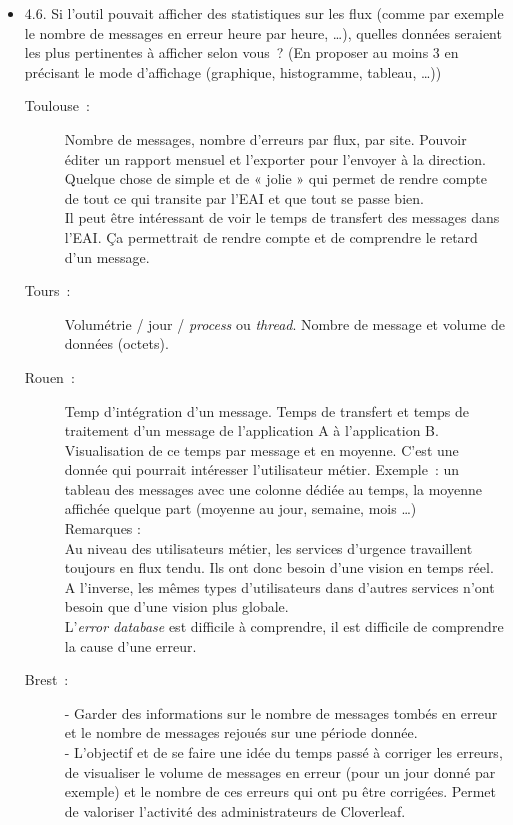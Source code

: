 \begin{itemize}
	  \item 4.6. Si l’outil pouvait afficher des statistiques sur les flux (comme
	  par exemple le nombre de messages en erreur heure par heure, …), quelles
	  données seraient les plus pertinentes à afficher selon vous~? (En proposer au
	  moins 3 en précisant le mode d’affichage (graphique, histogramme, tableau,
	  …))
	  \begin{description}
	  	\item[Toulouse~:] Nombre de messages, nombre d’erreurs par flux, par site.
	  	Pouvoir éditer un rapport mensuel et l’exporter pour l’envoyer à la
	  	direction. Quelque chose de simple et de « jolie » qui permet de rendre
	  	compte de tout ce qui transite par l’EAI et que tout se passe bien.\\
		Il peut être intéressant de voir le temps de transfert des messages dans l’EAI.
		Ça permettrait de rendre compte et de comprendre le retard d’un message.
	  	\item[Tours~:] Volumétrie / jour / \textit{process} ou \textit{thread}.
	  	Nombre de message et volume de données (octets).
	  	\item[Rouen~:] Temp d’intégration d’un message. Temps de transfert et temps
	  	de traitement d’un message de l’application A à l’application B.
	  	Visualisation de ce temps par message et en moyenne. C’est une donnée qui pourrait intéresser
	  	l’utilisateur métier. Exemple~: un tableau des messages avec une colonne
	  	dédiée au temps, la moyenne affichée quelque part (moyenne au jour, semaine,
	  	mois …)\\
	  	Remarques :\\
		Au niveau des utilisateurs métier, les services d’urgence travaillent toujours
		en flux tendu. Ils ont donc besoin d’une vision en temps réel. A l’inverse,
		les mêmes types d’utilisateurs dans d’autres services n’ont besoin que
		d’une vision plus globale.\\
		L’\textit{error database} est difficile à comprendre, il est difficile de
		comprendre la cause d’une erreur.
	  	\item[Brest~:] - Garder des informations sur le nombre de messages tombés en
	  	erreur et le nombre de messages rejoués sur une période donnée.\\
		- L’objectif et de se faire une idée du temps passé à corriger les erreurs, de
		visualiser le volume de messages en erreur (pour un jour donné par exemple) et
		le nombre de ces erreurs qui ont pu être corrigées. Permet de valoriser
		l’activité des administrateurs de Cloverleaf.

\end{description}
\end{itemize}
